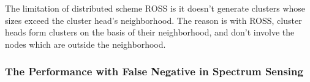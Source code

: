 \documentclass[times]{ettauth}
\theoremstyle{mytheoremstyle}
\theoremstyle{mytheoremstyle}
\theoremstyle{mytheoremstyle}
\begin{document}

The limitation of distributed scheme ROSS is it doesn't generate clusters whose sizes exceed the cluster head's neighborhood.
The reason is with ROSS, cluster heads form clusters on the basis of their neighborhood, and don't involve the nodes which are outside the neighborhood.

\subsubsection{The Performance with False Negative in Spectrum Sensing}
\end{document}
